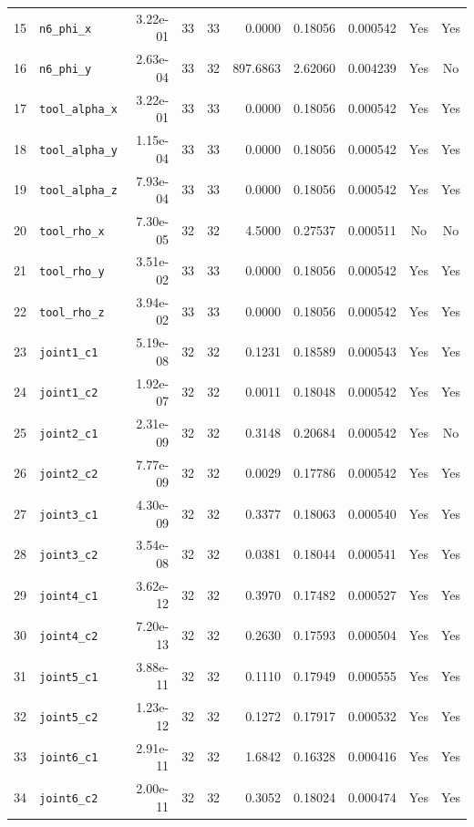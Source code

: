 \documentclass[11pt]{article}
\begin{document}
\begin{longtable}{@{}rlrccrrrcc@{}}
15 & \texttt{n6\_phi\_x} & 3.22e-01 & 33 & 33 & 0.0000 & 0.18056 & 0.000542 & Yes & Yes\\
16 & \texttt{n6\_phi\_y} & 2.63e-04 & 33 & 32 & 897.6863 & 2.62060 & 0.004239 & Yes & No\\
17 & \texttt{tool\_alpha\_x} & 3.22e-01 & 33 & 33 & 0.0000 & 0.18056 & 0.000542 & Yes & Yes\\
18 & \texttt{tool\_alpha\_y} & 1.15e-04 & 33 & 33 & 0.0000 & 0.18056 & 0.000542 & Yes & Yes\\
19 & \texttt{tool\_alpha\_z} & 7.93e-04 & 33 & 33 & 0.0000 & 0.18056 & 0.000542 & Yes & Yes\\
20 & \texttt{tool\_rho\_x} & 7.30e-05 & 32 & 32 & 4.5000 & 0.27537 & 0.000511 & No & No\\
21 & \texttt{tool\_rho\_y} & 3.51e-02 & 33 & 33 & 0.0000 & 0.18056 & 0.000542 & Yes & Yes\\
22 & \texttt{tool\_rho\_z} & 3.94e-02 & 33 & 33 & 0.0000 & 0.18056 & 0.000542 & Yes & Yes\\
23 & \texttt{joint1\_c1} & 5.19e-08 & 32 & 32 & 0.1231 & 0.18589 & 0.000543 & Yes & Yes\\
24 & \texttt{joint1\_c2} & 1.92e-07 & 32 & 32 & 0.0011 & 0.18048 & 0.000542 & Yes & Yes\\
25 & \texttt{joint2\_c1} & 2.31e-09 & 32 & 32 & 0.3148 & 0.20684 & 0.000542 & Yes & No\\
26 & \texttt{joint2\_c2} & 7.77e-09 & 32 & 32 & 0.0029 & 0.17786 & 0.000542 & Yes & Yes\\
27 & \texttt{joint3\_c1} & 4.30e-09 & 32 & 32 & 0.3377 & 0.18063 & 0.000540 & Yes & Yes\\
28 & \texttt{joint3\_c2} & 3.54e-08 & 32 & 32 & 0.0381 & 0.18044 & 0.000541 & Yes & Yes\\
29 & \texttt{joint4\_c1} & 3.62e-12 & 32 & 32 & 0.3970 & 0.17482 & 0.000527 & Yes & Yes\\
30 & \texttt{joint4\_c2} & 7.20e-13 & 32 & 32 & 0.2630 & 0.17593 & 0.000504 & Yes & Yes\\
31 & \texttt{joint5\_c1} & 3.88e-11 & 32 & 32 & 0.1110 & 0.17949 & 0.000555 & Yes & Yes\\
32 & \texttt{joint5\_c2} & 1.23e-12 & 32 & 32 & 0.1272 & 0.17917 & 0.000532 & Yes & Yes\\
33 & \texttt{joint6\_c1} & 2.91e-11 & 32 & 32 & 1.6842 & 0.16328 & 0.000416 & Yes & Yes\\
34 & \texttt{joint6\_c2} & 2.00e-11 & 32 & 32 & 0.3052 & 0.18024 & 0.000474 & Yes & Yes\\
\end{longtable}
\endgroup
\end{document}
